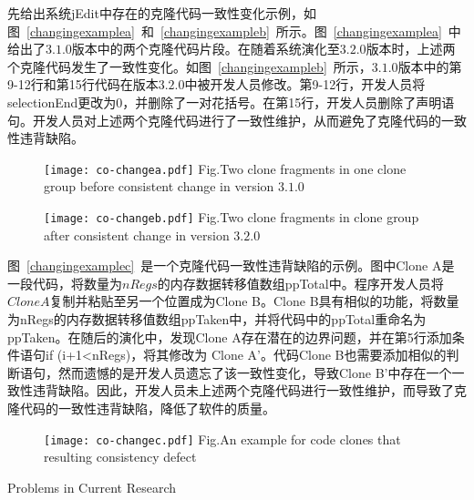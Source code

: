 先给出系统jEdit中存在的克隆代码一致性变化示例，如图~\ref{changingexamplea}~和~\ref{changingexampleb}~所示。图~\ref{changingexamplea}~中给出了$ 3.1.0 $版本中的两个克隆代码片段。在随着系统演化至$3.2.0$版本时，上述两个克隆代码发生了一致性变化。如图~\ref{changingexampleb}~所示，$ 3.1.0 $版本中的第9-12行和第15行代码在版本$ 3.2.0$中被开发人员修改。第9-12行，开发人员将{selectionEnd}更改为$0$，并删除了一对花括号。在第15行，开发人员删除了声明语句。开发人员对上述两个克隆代码进行了一致性维护，从而避免了克隆代码的一致性违背缺陷。

\begin{figure}[htbp]
\centering
\texttt{[image: co-changea.pdf]}
{Fig.$\!$}{Two clone fragments in one clone group before consistent change in version $3.1.0$}
\vspace{-1em}
\end{figure}

\begin{figure}[htbp]
\centering
\texttt{[image: co-changeb.pdf]}
{Fig.$\!$}{Two clone fragments in clone group after consistent change in version $3.2.0$}
\vspace{-1em}
\end{figure}

图~\ref{changingexamplec}~是一个克隆代码一致性违背缺陷的示例。图中Clone A是一段代码，将数量为$nRegs$的内存数据转移值数组{ppTotal}中。程序开发人员将$Clone A$复制并粘贴至另一个位置成为Clone B。Clone B具有相似的功能，将数量为{nRegs}的内存数据转移值数组{ppTaken}中，并将代码中的{ppTotal}重命名为{ppTaken}。在随后的演化中，发现Clone A存在潜在的边界问题，并在第5行添加条件语句{if (i+1<nRegs)}，将其修改为 Clone A’。代码Clone B也需要添加相似的判断语句，然而遗憾的是开发人员遗忘了该一致性变化，导致Clone B’中存在一个一致性违背缺陷。因此，开发人员未上述两个克隆代码进行一致性维护，而导致了克隆代码的一致性违背缺陷，降低了软件的质量。

\begin{figure}[htbp]
\centering
\texttt{[image: co-changec.pdf]}
{Fig.$\!$}{An example for code clones that resulting consistency defect\cite{nguyen2012clone}}
\vspace{-1em}
\end{figure}

{Problems in Current Research}

